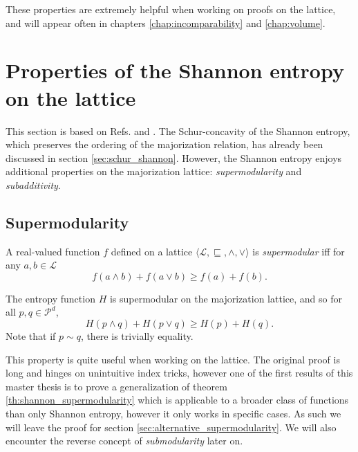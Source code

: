 
These properties are extremely helpful when working on proofs on the lattice, and will appear often in chapters \ref{chap:incomparability} and \ref{chap:volume}.



\section{Properties of the Shannon entropy on the lattice}

This section is based on Refs. \cite{cicalese_supermodularity_2002} and \cite{cicalese_information_2013}. The Schur-concavity of the Shannon entropy, which preserves the ordering of the majorization relation, has already been discussed in section \ref{sec:schur_shannon}. However, the Shannon entropy enjoys additional properties on the majorization lattice: \textit{supermodularity} and \textit{subadditivity}.



\subsection{Supermodularity} \label{sec:supermodularity}

\begin{definition} \label{def:supermodularity}
    A real-valued function $f$ defined on a lattice $\langle \mathcal{L}, \sqsubseteq, \wedge, \vee \rangle$ is \textit{supermodular} iff for any $a, b \in \mathcal{L}$
    \begin{equation}
        f(a \wedge b) + f(a \vee b) \geq f(a) + f(b).
    \end{equation}
\end{definition}


\begin{theorem} \label{th:shannon_supermodularity}
    The entropy function $H$ is supermodular on the majorization lattice, and so for all $p, q \in \mathcal{P}^d$,
    \begin{equation} \label{eq:supermodularity_shannon}
        H(p \wedge q) + H(p \vee q) \geq H(p) + H(q).
    \end{equation}
    Note that if $p \sim q$, there is trivially equality.
\end{theorem}

This property is quite useful when working on the lattice. The original proof is long and hinges on unintuitive index tricks, however one of the first results of this master thesis is to prove a generalization of theorem \ref{th:shannon_supermodularity} which is applicable to a broader class of functions than only Shannon entropy, however it only works in specific cases. As such we will leave the proof for section \ref{sec:alternative_supermodularity}. We will also encounter the reverse concept of \textit{submodularity} later on.

